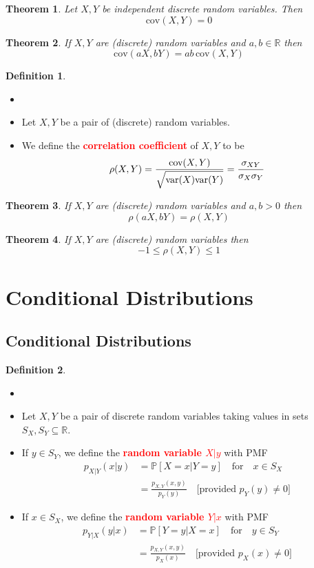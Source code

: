 \documentclass{article}
\newcommand{\PP}{\mathbb{P}}
\newcommand{\R}{\mathbb{R}}
\newcommand{\var}{\text{var}}
\newcommand{\cov}{\text{cov}}
\newcommand{\bfred}[1]{\textcolor{red}{\textbf{#1}}}
\theoremstyle{plain}
\newtheorem{thm}{Theorem}[section]
\theoremstyle{definition}
\newtheorem{defn}{Definition}[section]
\theoremstyle{remark}
\begin{document}
\begin{thm}
    Let $X,Y$ be independent discrete random variables. Then \[\cov(X,Y)=0\]
\end{thm}

\begin{thm}
    If $X,Y$ are (discrete) random variables and $a,b\in\R$ then \[\cov(aX,bY)=ab\,\cov(X,Y)\]
\end{thm}

\begin{defn}
    \begin{itemize}
        \item []
        \item Let $X,Y$ be a pair of (discrete) random variables.
        \item We define the \bfred{correlation coefficient} of $X,Y$ to be \[\rho(X,Y)=\frac{\cov(X,Y)}{\sqrt{\var(X)\var(Y)\vphantom{\bigr\vert}}} = \frac{\sigma_{XY}}{\sigma_X\sigma_Y}\]
    \end{itemize}
\end{defn}

\begin{thm}
    If $X,Y$ are (discrete) random variables and $a,b>0$ then \[\rho(aX,bY)=\rho(X,Y)\]
\end{thm}

\begin{thm}
    If $X,Y$ are (discrete) random variables then \[-1\leq\rho(X,Y)\leq1\]
\end{thm}

\section{Conditional Distributions}

\subsection{Conditional Distributions}

\begin{defn}
    \begin{itemize}
        \item []
        \item Let $X,Y$ be a pair of discrete random variables taking values in sets $S_X,S_Y\subseteq\R$.
        \item If $y\in S_Y$, we define the \bfred{random variable $X|y$} with PMF 
        \begin{align*}
            p_{X|Y}(x|y) &= \PP[X=x|Y=y]\quad\text{for}\quad x\in S_X \\
            &= \frac{p_{X,Y}(x,y)}{p_Y(y)}\quad\text{[provided $p_Y(y)\neq 0$]}
        \end{align*}
        \item If $x\in S_X$, we define the \bfred{random variable $Y|x$} with PMF 
        \begin{align*}
            p_{Y|X}(y|x) &= \PP[Y=y|X=x]\quad\text{for}\quad y\in S_Y \\
            &= \frac{p_{X,Y}(x,y)}{p_X(x)}\quad\text{[provided $p_X(x)\neq 0$]}
        \end{align*}
    \end{itemize}
\end{defn}
\end{document}

